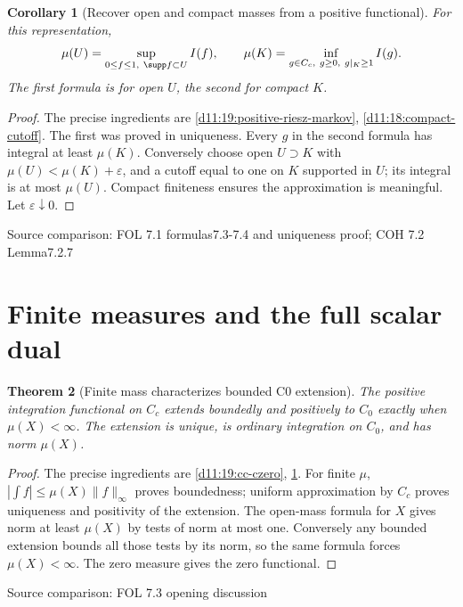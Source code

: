 \documentclass[11pt,oneside,openany]{book}
\newtheorem{theorem}{Theorem}[chapter]
\newtheorem{corollary}[theorem]{Corollary}
\theoremstyle{definition}
\theoremstyle{remark}
\newcommand{\eps}{\varepsilon}\newcommand{\ee}{\varepsilon}
\newcommand{\family}[1]{}
\newcommand{\source}[1]{\par\begingroup\small\sffamily\color{black!65}Source comparison: #1\par\endgroup}
\begin{document}
\begin{corollary}[Recover open and compact masses from a positive functional]\family{D11.19.recover_open_compact_mass}\label{d11:19:recover-open-compact-mass}
For this representation,
\[\mu(U)=\sup_{0\le f\le1,\ \supp f\subset U}I(f),\qquad
\mu(K)=\inf_{g\in C_c,\ g\ge0,\ g|_K\ge1}I(g).
\]
The first formula is for open $U$, the second for compact $K$.
\end{corollary}
\begin{proof}
The precise ingredients are \cref{d11:19:positive-riesz-markov}, \cref{d11:18:compact-cutoff}. The first was proved in uniqueness. Every $g$ in the second formula has integral at least $\mu(K)$. Conversely choose open $U\supset K$ with $\mu(U)<\mu(K)+\eps$, and a cutoff equal to one on $K$ supported in $U$; its integral is at most $\mu(U)$. Compact finiteness ensures the approximation is meaningful. Let $\eps\downarrow0$.
\end{proof}
\source{FOL 7.1 formulas7.3-7.4 and uniqueness proof; COH 7.2 Lemma7.2.7}

\section{Finite measures and the full scalar dual}

\begin{theorem}[Finite mass characterizes bounded C0 extension]\family{D11.19.finite_positive_czero}\label{d11:19:finite-positive-czero}
The positive integration functional on $C_c$ extends boundedly and positively to $C_0$ exactly when $\mu(X)<\infty$. The extension is unique, is ordinary integration on $C_0$, and has norm $\mu(X)$.
\end{theorem}
\begin{proof}
The precise ingredients are \cref{d11:19:cc-czero}, \cref{d11:19:recover-open-compact-mass}. For finite $\mu$, $|\int f|\le\mu(X)\|f\|_\infty$ proves boundedness; uniform approximation by $C_c$ proves uniqueness and positivity of the extension. The open-mass formula for $X$ gives norm at least $\mu(X)$ by tests of norm at most one. Conversely any bounded extension bounds all those tests by its norm, so the same formula forces $\mu(X)<\infty$. The zero measure gives the zero functional.
\end{proof}
\source{FOL 7.3 opening discussion}
\end{document}
